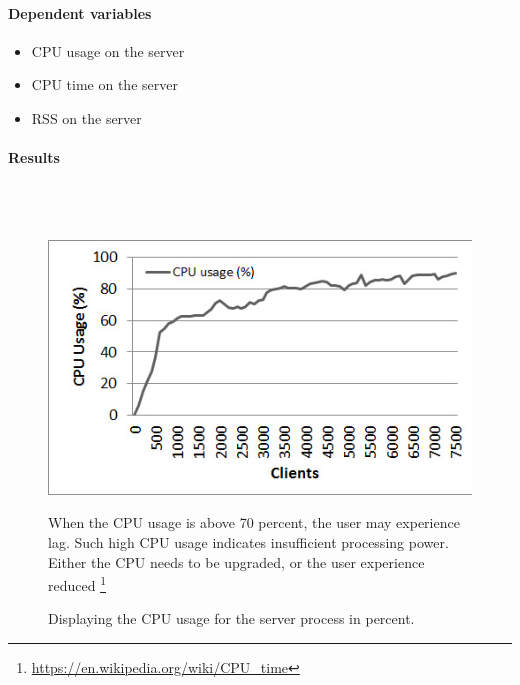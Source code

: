 \documentclass[12pt]{article}
\begin{document}
\paragraph{Dependent variables}
\begin{itemize}
\item CPU usage on the server
\item CPU time on the server
\item RSS on the server
\end{itemize}

\paragraph{Results}\mbox{}\\\\

\begin{center}

\begin{figure}
\includegraphics[scale=0.75]{test_CLIENT_CPUusage.jpg}
\caption{Displaying the CPU usage for the server process in percent.}
\vspace{1em}
When the CPU usage is above 70 percent, the user may experience lag. Such high CPU usage indicates insufficient processing power. Either the CPU needs to be upgraded, or the user experience reduced 
\footnote{\url{https://en.wikipedia.org/wiki/CPU_time}}
\end{figure}



\end{center}
\end{document}

